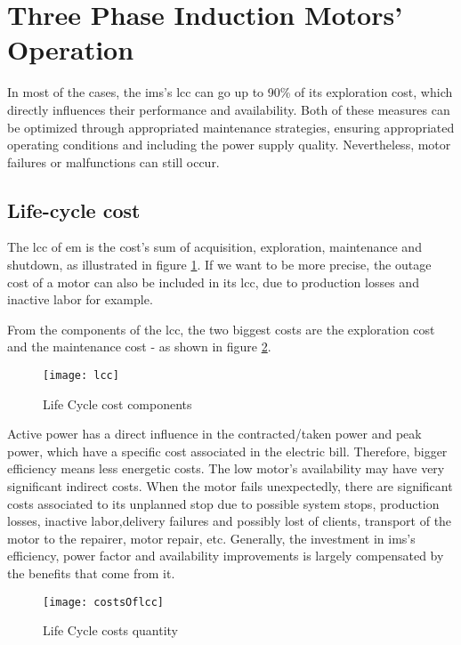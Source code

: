 \section{Three Phase Induction Motors' Operation} %
\label{sec:Three_phase_induction_motors_maintenance_and_lyfe_cycle}

In most of the cases, the \acrshort{ims}'s \acrfull{lcc} can go up to 90\% of its exploration cost, which directly influences their performance and availability. Both of these measures can be optimized through appropriated maintenance strategies, ensuring appropriated operating conditions and including the power supply quality. Nevertheless, motor failures or malfunctions can still occur.

\subsection{Life-cycle cost}
\label{subsec:life_cycle_cost}

The \acrshort{lcc} of \acrshort{em} is the cost's sum of acquisition, exploration, maintenance and shutdown, as illustrated in figure \ref{fig:lcc}. If we want to be more precise, the outage cost of a motor can also be included in its \acrshort{lcc}, due to production losses and inactive labor for example.


From the components of the \acrshort{lcc}, the two biggest costs are the exploration cost and the maintenance cost - as shown in figure \ref{fig:costsOflcc}.

\begin{figure}[htbp]
	\centering
	\texttt{[image: lcc]}
	\caption{Life Cycle cost components}
	\label{fig:lcc}
\end{figure}

Active power has a direct influence in the contracted/taken power and peak power, which have a specific cost associated in the electric bill. Therefore, bigger efficiency means less energetic costs.
The low motor's availability may have very significant indirect costs. When the motor fails unexpectedly, there are significant costs associated to its unplanned stop due to possible system stops, production losses, inactive labor,delivery failures and possibly lost of clients, transport of the motor to the repairer, motor repair, etc. 
Generally, the investment in \acrshort{ims}'s efficiency, power factor and availability improvements is largely compensated by the benefits that come from it.
 
\begin{figure}[htbp]
	\centering
	\texttt{[image: costsOflcc]}
	\caption{Life Cycle costs quantity}
	\label{fig:costsOflcc}
\end{figure}

